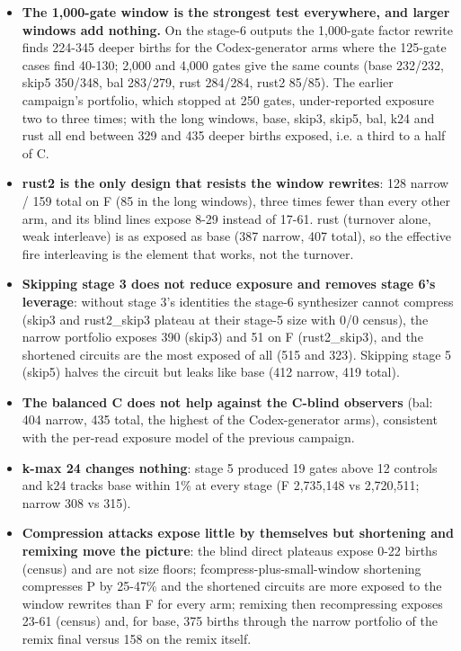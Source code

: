 \documentclass[10pt,a4paper]{article}
\begin{document}
\begin{itemize}
\item \textbf{The 1,000-gate window is the strongest test everywhere, and larger windows add nothing.} On the stage-6 outputs the 1,000-gate factor rewrite finds 224-345 deeper births for the Codex-generator arms where the 125-gate cases find 40-130; 2,000 and 4,000 gates give the same counts (base 232/\allowbreak{}232, skip5 350/\allowbreak{}348, bal 283/\allowbreak{}279, rust 284/\allowbreak{}284, rust2 85/\allowbreak{}85). The earlier campaign's portfolio, which stopped at 250 gates, under-reported exposure two to three times; with the long windows, base, skip3, skip5, bal, k24 and rust all end between 329 and 435 deeper births exposed, i.e. a third to a half of C.
\item \textbf{rust2 is the only design that resists the window rewrites}: 128 narrow /\allowbreak{} 159 total on F (85 in the long windows), three times fewer than every other arm, and its blind lines expose 8-29 instead of 17-61. rust (turnover alone, weak interleave) is as exposed as base (387 narrow, 407 total), so the effective fire interleaving is the element that works, not the turnover.
\item \textbf{Skipping stage 3 does not reduce exposure and removes stage 6's leverage}: without stage 3's identities the stage-6 synthesizer cannot compress (skip3 and rust2\_skip3 plateau at their stage-5 size with 0/\allowbreak{}0 census), the narrow portfolio exposes 390 (skip3) and 51 on F (rust2\_skip3), and the shortened circuits are the most exposed of all (515 and 323). Skipping stage 5 (skip5) halves the circuit but leaks like base (412 narrow, 419 total).
\item \textbf{The balanced C does not help against the C-blind observers} (bal: 404 narrow, 435 total, the highest of the Codex-generator arms), consistent with the per-read exposure model of the previous campaign.
\item \textbf{k-max 24 changes nothing}: stage 5 produced 19 gates above 12 controls and k24 tracks base within 1\% at every stage (F 2,735,148 vs 2,720,511; narrow 308 vs 315).
\item \textbf{Compression attacks expose little by themselves but shortening and remixing move the picture}: the blind direct plateaus expose 0-22 births (census) and are not size floors; fcompress-plus-small-window shortening compresses P by 25-47\% and the shortened circuits are more exposed to the window rewrites than F for every arm; remixing then recompressing exposes 23-61 (census) and, for base, 375 births through the narrow portfolio of the remix final versus 158 on the remix itself.

\end{itemize}
\end{document}
